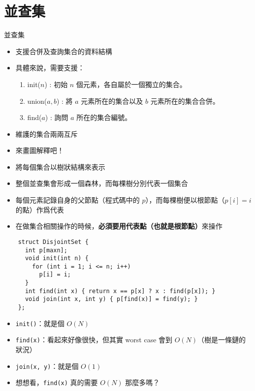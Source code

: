\documentclass[standalone]{beamer}
\begin{document}
\section{並查集}

\begin{frame}{並查集}
  \begin{itemize}
    \item 支援合併及查詢集合的資料結構
    \item 具體來說，需要支援：
    \begin{enumerate}
      \item init($n$) : 初始 $n$ 個元素，各自屬於一個獨立的集合。
      \item union($a, b$) : 將 $a$ 元素所在的集合以及 $b$ 元素所在的集合合併。
      \item find($a$) : 詢問 $a$ 所在的集合編號。
    \end{enumerate}
    \item 維護的集合兩兩互斥
    \item 來畫圖解釋吧！
  \end{itemize}
\end{frame}

\begin{frame}{}
  \begin{itemize}
    \item 將每個集合以樹狀結構來表示
    \item 整個並查集會形成一個森林，而每棵樹分別代表一個集合
    \item 每個元素記錄自身的父節點（程式碼中的 $p$），而每棵樹便以根節點（$p[i] = i$ 的點）作爲代表
    \item 在做集合相關操作的時候，\textbf{必須要用代表點（也就是根節點）}來操作
  \end{itemize}
\end{frame}

\begin{frame}[fragile]{}
  \begin{verbatim}
    struct DisjointSet {
      int p[maxn];
      void init(int n) {
        for (int i = 1; i <= n; i++)
          p[i] = i;
      }
      int find(int x) { return x == p[x] ? x : find(p[x]); }
      void join(int x, int y) { p[find(x)] = find(y); }
    };
  \end{verbatim}
\end{frame}

\begin{frame}{}
  \begin{itemize}
    \item \texttt{init()}：就是個 $O(N)$
    \item \texttt{find(x)}：看起來好像很快，但其實 worst case 會到 $O(N)$（樹是一條鏈的狀況）
    \item \texttt{join(x, y)}：就是個 $O(1)$
    \item 想想看，\texttt{find(x)} 真的需要 $O(N)$ 那麼多嗎？
  \end{itemize}
\end{frame}
\end{document}
